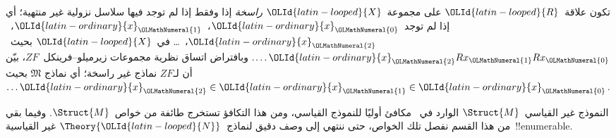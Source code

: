\documentclass[../../../include/open-logic-section]{subfiles}
\begin{document}
\begin{prob}
تكون علاقة~${\OLId{latin-looped}{R}}$ على مجموعة~${\OLId{latin-looped}{X}}$ \emph{راسخة} إذا وفقط إذا لم توجد فيها
سلاسل نزولية غير منتهية؛ أي إذا لم توجد~${\OLId{latin-ordinary}{x}}_{\OLMathNumeral{0}}$،~${\OLId{latin-ordinary}{x}}_{\OLMathNumeral{1}}$،~${\OLId{latin-ordinary}{x}}_{\OLMathNumeral{2}}$،~\dots
في~${\OLId{latin-looped}{X}}$ بحيث~$\dots {\OLId{latin-ordinary}{x}}_{\OLMathNumeral{2}}Rx_{\OLMathNumeral{1}}Rx_{\OLMathNumeral{0}}$. وبافتراض اتساق نظرية مجموعات
زيرميلو--فرينكل~$ZF$، بيّن أن لـ$ZF$ نماذج غير راسخة؛ أي نماذج
$\mathfrak{M}$ بحيث~$\dots {\OLId{latin-ordinary}{x}}_{\OLMathNumeral{2}} \in {\OLId{latin-ordinary}{x}}_{\OLMathNumeral{1}} \in {\OLId{latin-ordinary}{x}}_{\OLMathNumeral{0}}$.
\end{prob}

النموذج غير القياسي~$\Struct{M}$ الوارد في~ مكافئ
أوليًا للنموذج القياسي، ومن هذا التكافؤ تستخرج طائفة من خواص~$\Struct{M}$.
وفيما بقي من هذا القسم نفصل تلك الخواص، حتى ننتهي إلى وصف دقيق لنماذج~$\Theory{{\OLId{latin-looped}{N}}}$
غير القياسية~!!{enumerable}.
\end{document}
